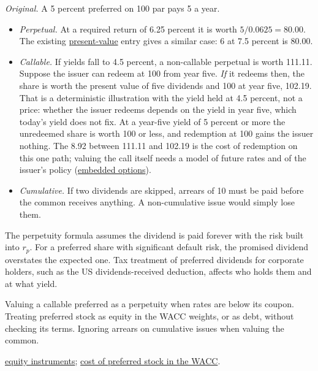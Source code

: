 \begin{qfmethod}
 \emph{Original.} A 5 percent preferred on 100 par pays 5 a year.
\begin{itemize}
\item \emph{Perpetual.} At a required return of 6.25 percent it is worth $5/0.0625=80.00$. The existing \hyperref[meth:instrument-present-value]{present-value} entry gives a similar case: 6 at 7.5 percent is 80.00.
\item \emph{Callable.} If yields fall to 4.5 percent, a non-callable perpetual is worth 111.11. Suppose the issuer can redeem at 100 from year five. \emph{If} it redeems then, the share is worth the present value of five dividends and 100 at year five, 102.19. That is a deterministic illustration with the yield held at 4.5 percent, not a price: whether the issuer redeems depends on the yield in year five, which today's yield does not fix. At a year-five yield of 5 percent or more the unredeemed share is worth 100 or less, and redemption at 100 gains the issuer nothing. The 8.92 between 111.11 and 102.19 is the cost of redemption on this one path; valuing the call itself needs a model of future rates and of the issuer's policy (\hyperref[meth:callable-putable-bond-valuation]{embedded options}).
\item \emph{Cumulative.} If two dividends are skipped, arrears of 10 must be paid before the common receives anything. A non-cumulative issue would simply lose them.
\end{itemize}

 The perpetuity formula assumes the dividend is paid forever with the risk built into $r_p$. For a preferred share with significant default risk, the promised dividend overstates the expected one. Tax treatment of preferred dividends for corporate holders, such as the US dividends-received deduction, affects who holds them and at what yield.

 Valuing a callable preferred as a perpetuity when rates are below its coupon. Treating preferred stock as equity in the WACC weights, or as debt, without checking its terms. Ignoring arrears on cumulative issues when valuing the common.

 \hyperref[def:equity-instruments]{equity instruments}; \hyperref[meth:wacc-calculation]{cost of preferred stock in the WACC}.

\end{qfmethod}

